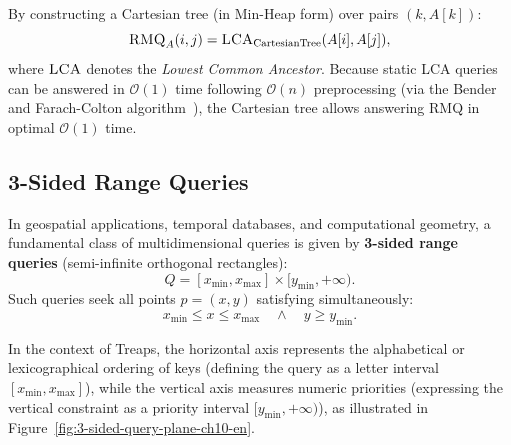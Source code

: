 By constructing a Cartesian tree (in Min-Heap form) over pairs $(k, A[k])$:
\begin{equation}
  \textsc{RMQ}_A(i, j) = \textsc{LCA}_{\text{CartesianTree}}(A[i], A[j]),
\end{equation}
where $\textsc{LCA}$ denotes the \textit{Lowest Common Ancestor}. Because static LCA queries can be answered in $\mathcal{O}(1)$ time following $\mathcal{O}(n)$ preprocessing (via the Bender and Farach-Colton algorithm~\cite{bender2000}), the Cartesian tree allows answering RMQ in optimal $\mathcal{O}(1)$ time.

\subsection{3-Sided Range Queries}
In geospatial applications, temporal databases, and computational geometry, a fundamental class of multidimensional queries is given by \textbf{3-sided range queries} (semi-infinite orthogonal rectangles):
\begin{equation}
  Q = [x_{\min}, x_{\max}] \times [y_{\min}, +\infty).
\end{equation}
Such queries seek all points $p = (x, y)$ satisfying simultaneously:
\begin{equation}
  x_{\min} \le x \le x_{\max} \quad \land \quad y \ge y_{\min}.
\end{equation}

In the context of Treaps, the horizontal axis represents the alphabetical or lexicographical ordering of keys (defining the query as a letter interval $[x_{\min}, x_{\max}]$), while the vertical axis measures numeric priorities (expressing the vertical constraint as a priority interval $[y_{\min}, +\infty)$), as illustrated in Figure~\ref{fig:3-sided-query-plane-ch10-en}.


